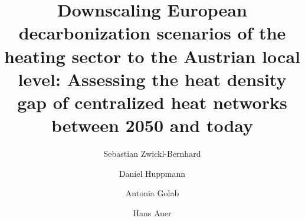 \documentclass[review]{elsarticle}
\begin{document}
\begin{frontmatter}

\title{Downscaling European decarbonization scenarios of the heating sector to the Austrian local level: Assessing the heat density gap of centralized heat networks between 2050 and today}
\author[1]{Sebastian Zwickl-Bernhard}
\author[2]{Daniel Huppmann}
\author[1]{Antonia Golab}
\author[1]{Hans Auer}
\address[1]{Energy Economics Group (EEG), Technische Universität Wien, Gusshausstrasse 25-29/E370-3, 1040 Wien, Austria}
\address[2]{Energy, Climate and Environment (ECE) Program,  International Institute for Applied Systems Analysis (IIASA), Laxenburg, Austria}
\begin{abstract}
\end{abstract}

\begin{keyword}
\end{keyword}
\end{frontmatter}
\end{document}
